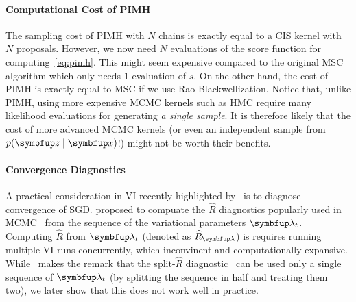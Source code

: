 \paragraph{Computational Cost of PIMH}
The sampling cost of PIMH with \(N\) chains is exactly equal to a CIS kernel with \(N\) proposals.
However, we now need \(N\) evaluations of the score function for computing~\eqref{eq:pimh}.
This might seem expensive compared to the original MSC algorithm which only needs 1 evaluation of \(s\).
On the other hand, the cost of PIMH is exactly equal to MSC if we use Rao-Blackwellization.
Notice that, unlike PIMH, using more expensive MCMC kernels such as HMC require many likelihood evaluations for generating \textit{a single sample}.
It is therefore likely that the cost of more advanced MCMC kernels (or even an independent sample from \(p(\vz\mid\vx)\)!) might not be worth their benefits.

\paragraph{Convergence Diagnostics}
A practical consideration in VI recently highlighted by~\citet{NEURIPS2020_7cac11e2} is to diagnose convergence of SGD.
\citeauthor{NEURIPS2020_7cac11e2} proposed to compuate the \(\widehat{R}\) diagnostics popularly used in MCMC~\citep{gelman_inference_1992, vehtari_ranknormalization_2020} from the sequence of the variational parameters \(\vlambda_t\).
Computing \(\widehat{R}\) from \(\vlambda_t\) (denoted as \(\widehat{R}_{\vlambda}\)) is requires running multiple VI runs concurrently, which inconvinent and computationally expansive.
While~\citeauthor{NEURIPS2020_7cac11e2} makes the remark that the split-\(\widehat{R}\) diagnostic~\citep{gelman_bayesian_2014} can be used only a single sequence of \(\vlambda_t\) (by splitting the sequence in half and treating them two), we later show that this does not work well in practice.

